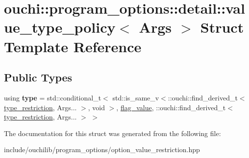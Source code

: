 \hypertarget{structouchi_1_1program__options_1_1detail_1_1value__type__policy}{}\section{ouchi\+::program\+\_\+options\+::detail\+::value\+\_\+type\+\_\+policy$<$ Args $>$ Struct Template Reference}
\label{structouchi_1_1program__options_1_1detail_1_1value__type__policy}
\subsection*{Public Types}
\begin{DoxyCompactItemize}
\item 
\mbox{\label{structouchi_1_1program__options_1_1detail_1_1value__type__policy_a753e4b2156ee9b74dafb897bc1962657}} 
using {\bfseries type} = std\+::conditional\+\_\+t$<$ std\+::is\+\_\+same\+\_\+v$<$\+::ouchi\+::find\+\_\+derived\+\_\+t$<$ \mbox{\hyperlink{structouchi_1_1program__options_1_1detail_1_1type__restriction}{type\+\_\+restriction}}, Args... $>$, void $>$, \mbox{\hyperlink{structouchi_1_1program__options_1_1detail_1_1flag__value}{flag\+\_\+value}}, \+::ouchi\+::find\+\_\+derived\+\_\+t$<$ \mbox{\hyperlink{structouchi_1_1program__options_1_1detail_1_1type__restriction}{type\+\_\+restriction}}, Args... $>$ $>$
\end{DoxyCompactItemize}


The documentation for this struct was generated from the following file\+:\begin{DoxyCompactItemize}
\item 
include/ouchilib/program\+\_\+options/option\+\_\+value\+\_\+restriction.\+hpp\end{DoxyCompactItemize}
